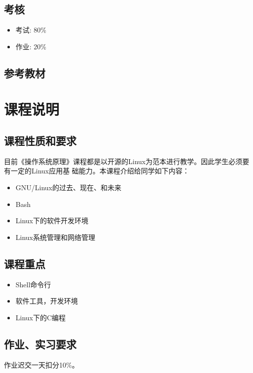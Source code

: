 \documentclass{wx672article}
\begin{document}
\subsection{考核}

\begin{itemize}
\item 考试: 80\%
\item 作业: 20\%
\end{itemize}

\subsection{参考教材}

\nocite{cooper10bash,web:debianhandbook}
\printbibliography[heading=none]{}


\section{课程说明}

\subsection{课程性质和要求}

目前《操作系统原理》课程都是以开源的Linux为范本进行教学。因此学生必须要有一定的Linux应用基
础能力。本课程介绍给同学如下内容：
\begin{itemize}
\item GNU/Linux的过去、现在、和未来
\item Bash
\item Linux下的软件开发环境
\item Linux系统管理和网络管理
\end{itemize}

\subsection{课程重点}

\begin{itemize}
\item Shell命令行
\item 软件工具，开发环境
\item Linux下的C编程
\end{itemize}

\subsection{作业、实习要求}
作业迟交一天扣分10\%。
\end{document}
